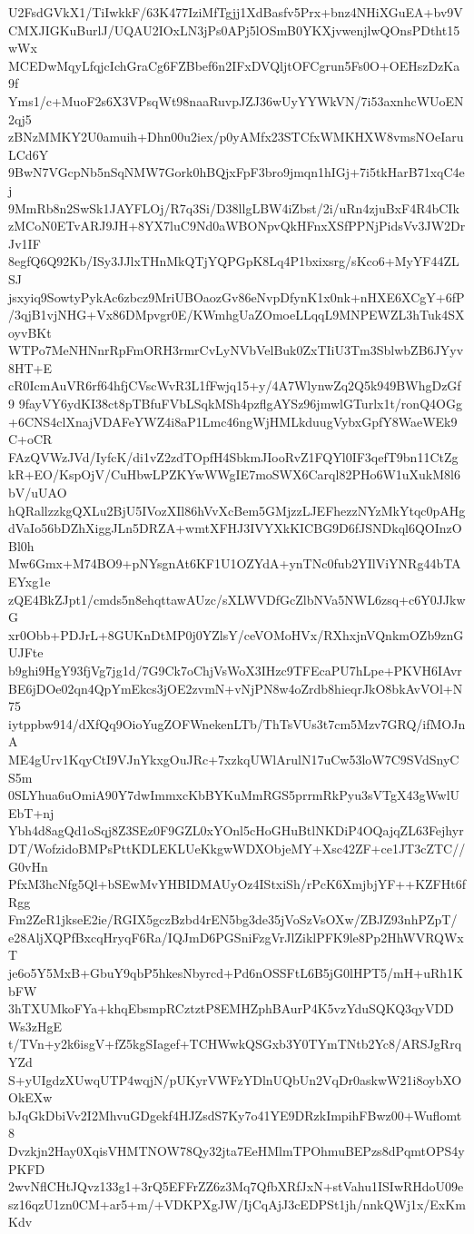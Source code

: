 U2FsdGVkX1/TiIwkkF/63K477IziMfTgjj1XdBasfv5Prx+bnz4NHiXGuEA+bv9V
CMXJIGKuBurlJ/UQAU2IOxLN3jPs0APj5lOSmB0YKXjvwenjlwQOnsPDtht15wWx
MCEDwMqyLfqjcIchGraCg6FZBbef6n2IFxDVQljtOFCgrun5Fs0O+OEHszDzKa9f
Yms1/c+MuoF2s6X3VPsqWt98naaRuvpJZJ36wUyYYWkVN/7i53axnhcWUoEN2qj5
zBNzMMKY2U0amuih+Dhn00u2iex/p0yAMfx23STCfxWMKHXW8vmsNOeIaruLCd6Y
9BwN7VGcpNb5nSqNMW7Gork0hBQjxFpF3bro9jmqn1hIGj+7i5tkHarB71xqC4ej
9MmRb8n2SwSk1JAYFLOj/R7q3Si/D38llgLBW4iZbst/2i/uRn4zjuBxF4R4bCIk
zMCoN0ETvARJ9JH+8YX7luC9Nd0aWBONpvQkHFnxXSfPPNjPidsVv3JW2DrJv1IF
8egfQ6Q92Kb/ISy3JJlxTHnMkQTjYQPGpK8Lq4P1bxixsrg/sKco6+MyYF44ZLSJ
jsxyiq9SowtyPykAc6zbcz9MriUBOaozGv86eNvpDfynK1x0nk+nHXE6XCgY+6fP
/3qjB1vjNHG+Vx86DMpvgr0E/KWmhgUaZOmoeLLqqL9MNPEWZL3hTuk4SXoyvBKt
WTPo7MeNHNnrRpFmORH3rmrCvLyNVbVelBuk0ZxTIiU3Tm3SblwbZB6JYyv8HT+E
cR0IcmAuVR6rf64hfjCVscWvR3L1fFwjq15+y/4A7WlynwZq2Q5k949BWhgDzGf9
9fayVY6ydKI38ct8pTBfuFVbLSqkMSh4pzflgAYSz96jmwlGTurlx1t/ronQ4OGg
+6CNS4clXnajVDAFeYWZ4i8aP1Lmc46ngWjHMLkduugVybxGpfY8WaeWEk9C+oCR
FAzQVWzJVd/IyfcK/di1vZ2zdTOpfH4SbkmJIooRvZ1FQYl0IF3qefT9bn11CtZg
kR+EO/KspOjV/CuHbwLPZKYwWWgIE7moSWX6Carql82PHo6W1uXukM8l6bV/uUAO
hQRallzzkgQXLu2BjU5IVozXIl86hVvXcBem5GMjzzLJEFhezzNYzMkYtqc0pAHg
dVaIo56bDZhXiggJLn5DRZA+wmtXFHJ3IVYXkKICBG9D6fJSNDkql6QOInzOBl0h
Mw6Gmx+M74BO9+pNYsgnAt6KF1U1OZYdA+ynTNc0fub2YIlViYNRg44bTAEYxg1e
zQE4BkZJpt1/cmds5n8ehqttawAUzc/sXLWVDfGcZlbNVa5NWL6zsq+c6Y0JJkwG
xr0Obb+PDJrL+8GUKnDtMP0j0YZlsY/ceVOMoHVx/RXhxjnVQnkmOZb9znGUJFte
b9ghi9HgY93fjVg7jg1d/7G9Ck7oChjVsWoX3IHzc9TFEcaPU7hLpe+PKVH6IAvr
BE6jDOe02qn4QpYmEkcs3jOE2zvmN+vNjPN8w4oZrdb8hieqrJkO8bkAvVOl+N75
iytppbw914/dXfQq9OioYugZOFWnekenLTb/ThTsVUs3t7cm5Mzv7GRQ/ifMOJnA
ME4gUrv1KqyCtI9VJnYkxgOuJRc+7xzkqUWlArulN17uCw53loW7C9SVdSnyCS5m
0SLYhua6uOmiA90Y7dwImmxcKbBYKuMmRGS5prrmRkPyu3sVTgX43gWwlUEbT+nj
Ybh4d8agQd1oSqj8Z3SEz0F9GZL0xYOnl5cHoGHuBtlNKDiP4OQajqZL63Fejhyr
DT/WofzidoBMPsPttKDLEKLUeKkgwWDXObjeMY+Xsc42ZF+ce1JT3cZTC//G0vHn
PfxM3hcNfg5Ql+bSEwMvYHBIDMAUyOz4IStxiSh/rPcK6XmjbjYF++KZFHt6fRgg
Fm2ZeR1jkseE2ie/RGIX5gczBzbd4rEN5bg3de35jVoSzVsOXw/ZBJZ93nhPZpT/
e28AljXQPfBxcqHryqF6Ra/IQJmD6PGSniFzgVrJlZiklPFK9le8Pp2HhWVRQWxT
je6o5Y5MxB+GbuY9qbP5hkesNbyrcd+Pd6nOSSFtL6B5jG0lHPT5/mH+uRh1KbFW
3hTXUMkoFYa+khqEbsmpRCztztP8EMHZphBAurP4K5vzYduSQKQ3qyVDDWs3zHgE
t/TVn+y2k6isgV+fZ5kgSIagef+TCHWwkQSGxb3Y0TYmTNtb2Yc8/ARSJgRrqYZd
S+yUIgdzXUwqUTP4wqjN/pUKyrVWFzYDlnUQbUn2VqDr0askwW21i8oybXOOkEXw
bJqGkDbiVv2I2MhvuGDgekf4HJZsdS7Ky7o41YE9DRzkImpihFBwz00+Wuflomt8
Dvzkjn2Hay0XqisVHMTNOW78Qy32jta7EeHMlmTPOhmuBEPzs8dPqmtOPS4yPKFD
2wvNflCHtJQvz133g1+3rQ5EFFrZZ6z3Mq7QfbXRfJxN+stVahu1ISIwRHdoU09e
sz16qzU1zn0CM+ar5+m/+VDKPXgJW/IjCqAjJ3cEDPSt1jh/nnkQWj1x/ExKmKdv
